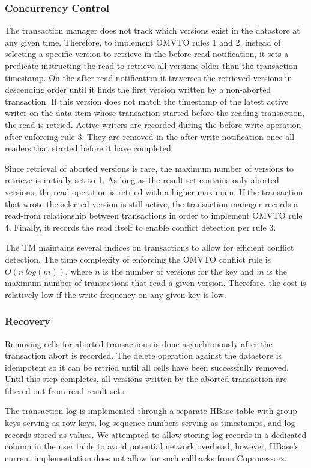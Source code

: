 \documentclass[10pt,final,journal]{IEEEtran}
\begin{document}
\subsubsection{Concurrency Control}
The transaction manager does not track which versions exist in the datastore at any given time. Therefore, to implement OMVTO rules 1 and 2, instead of selecting a specific version to retrieve in the before-read notification, it sets a predicate instructing the read to retrieve all versions older than the transaction timestamp. On the after-read notification it traverses the retrieved versions in descending order until it finds the first version written by a non-aborted transaction. If this version does not match the timestamp of the latest active writer on the data item whose transaction started before the reading transaction, the read is retried. Active writers are recorded during the before-write operation after enforcing rule 3. They are removed in the after write notification once all readers that started before it have completed.

Since retrieval of aborted versions is rare, the maximum number of versions to retrieve is initially set to 1. As long as the result set contains only aborted versions, the read operation is retried with a higher maximum. If the transaction that wrote the selected version is still active, the transaction manager records a read-from relationship between transactions in order to implement OMVTO rule 4. Finally, it records the read itself to enable conflict detection per rule 3.

The TM maintains several indices on transactions to allow for efficient conflict detection. The time complexity of enforcing the OMVTO conflict rule is $O(n \: log(m))$, where $n$ is the number of versions for the key and $m$ is the maximum number of transactions that read a given version. Therefore, the cost is relatively low if the write frequency on any given key is low.

\subsubsection{Recovery}
Removing cells for aborted transactions is done asynchronously after the transaction abort is recorded. The delete operation against the datastore is idempotent so it can be retried until all cells have been successfully removed. Until this step completes, all versions written by the aborted transaction are filtered out from read result sets.

The transaction log is implemented through a separate HBase table with group keys serving as row keys, log sequence numbers serving as timestamps, and log records stored as values. We attempted to allow storing log records in a dedicated column in the user table to avoid potential network overhead, however, HBase's current implementation does not allow for such callbacks from Coprocessors.
\end{document}
